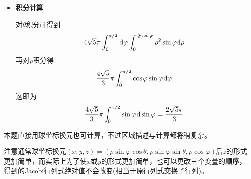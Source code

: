 \documentclass[a4paper,UTF8,fontset=windows,AutoFakeBold]{ctexart}
\newcommand*{\dr}{\hspace{0.07em}\mathrm{d}}
\newcommand*{\note}{\noindent *}
\theoremstyle{ex}
\begin{document}
\begin{framed}
{\begin{itemize}
        \item \textbf{积分计算}
        
        对$\theta$积分可得到
        $$4\sqrt5\pi\int_0^{\pi/2}\dr\varphi\int_0^{\sqrt[3]{\cos\varphi}}\rho^2\sin\varphi\dr\rho$$
        再对$\rho$积分得
        $$\frac{4\sqrt5}{3}\pi\int_0^{\pi/2}\cos\varphi\sin\varphi\dr\varphi$$
        这即为
        $$\frac{4\sqrt5}{3}\pi\int_0^{\pi/2}\sin\varphi\dr\sin\varphi=\frac{2\sqrt5\pi}{3}$$
    \end{itemize}

    \note 本题直接用球坐标换元也可计算，不过区域描述与计算都将稍复杂。
}
\end{framed}

\note 注意通常球坐标换元$(x,y,z)=(\rho\sin\varphi\cos\theta,\rho\sin\varphi\sin\theta,\rho\cos\varphi)$后$z$的形式更加简单，而实际上为了使$x$或$y$的形式更加简单，也可以更改三个变量的\textbf{顺序}，得到的Jacobi行列式绝对值不会改变(相当于原行列式交换了行列)。

\
\end{document}
